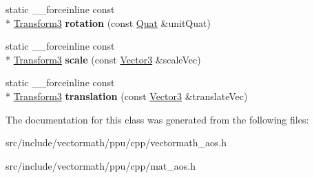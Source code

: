 \begin{DoxyCompactItemize}
\item 
\hypertarget{classVectormath_1_1Aos_1_1Transform3_a8511010a6ffaa490da0a56673c639507}{static \-\_\-\-\_\-forceinline const \\*
\hyperlink{classVectormath_1_1Aos_1_1Transform3}{Transform3} {\bfseries rotation} (const \hyperlink{classVectormath_1_1Aos_1_1Quat}{Quat} \&unit\-Quat)}\label{classVectormath_1_1Aos_1_1Transform3_a8511010a6ffaa490da0a56673c639507}

\item 
\hypertarget{classVectormath_1_1Aos_1_1Transform3_a72cc51c6b23e363a590f727149e24127}{static \-\_\-\-\_\-forceinline const \\*
\hyperlink{classVectormath_1_1Aos_1_1Transform3}{Transform3} {\bfseries scale} (const \hyperlink{classVectormath_1_1Aos_1_1Vector3}{Vector3} \&scale\-Vec)}\label{classVectormath_1_1Aos_1_1Transform3_a72cc51c6b23e363a590f727149e24127}

\item 
\hypertarget{classVectormath_1_1Aos_1_1Transform3_a93e1a7dd7f5a5dcd7bd104e6ce5ee27d}{static \-\_\-\-\_\-forceinline const \\*
\hyperlink{classVectormath_1_1Aos_1_1Transform3}{Transform3} {\bfseries translation} (const \hyperlink{classVectormath_1_1Aos_1_1Vector3}{Vector3} \&translate\-Vec)}\label{classVectormath_1_1Aos_1_1Transform3_a93e1a7dd7f5a5dcd7bd104e6ce5ee27d}

\end{DoxyCompactItemize}


The documentation for this class was generated from the following files\-:\begin{DoxyCompactItemize}
\item 
src/include/vectormath/ppu/cpp/vectormath\-\_\-aos.\-h\item 
src/include/vectormath/ppu/cpp/mat\-\_\-aos.\-h\end{DoxyCompactItemize}
